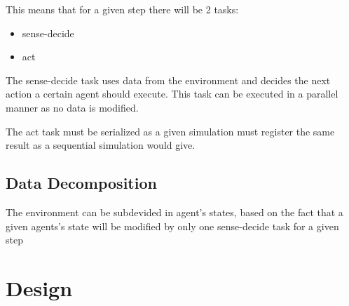 \documentclass[12pt, a4paper]{report}
\begin{document}
This means that for a given step there will be 2 tasks:
\begin{itemize}
    \item sense-decide
    \item act
\end{itemize}

The sense-decide task uses data from the environment and decides
 the next action a certain agent should execute. This task can
 be executed in a parallel manner as no data is modified.

The act task must be serialized as a given simulation must register
 the same result as a sequential simulation would give.

\section{Data Decomposition}
The environment can be subdevided in agent's states, based
 on the fact that a given agents's state will be modified
 by only one sense-decide task for a given step

\chapter{Design}



\end{document}
